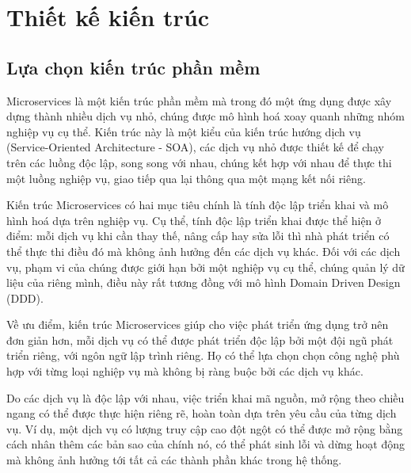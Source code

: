 \documentclass[../DoAn.tex]{subfiles}
\begin{document}
\section{Thiết kế kiến trúc}
\label{section:4.1}
\subsection{Lựa chọn kiến trúc phần mềm}
\label{subsection:4.1.1}
Microservices là một kiến trúc phần mềm mà trong đó một ứng dụng được xây dựng thành nhiều dịch vụ nhỏ, chúng được mô hình hoá xoay quanh những nhóm nghiệp vụ cụ thể.
Kiến trúc này là một kiểu của kiến trúc hướng dịch vụ (Service-Oriented Architecture - SOA), các dịch vụ nhỏ được thiết kế để chạy trên các luồng độc lập, song song
với nhau, chúng kết hợp với nhau để thực thi một luồng nghiệp vụ, giao tiếp qua lại thông qua một mạng kết nối riêng.\cite{MicroservicesPatterns}

Kiến trúc Microservices có hai mục tiêu chính là tính độc lập triển khai và mô hình hoá dựa trên nghiệp vụ. Cụ thể, tính độc lập triển khai được thể hiện ở điểm:
mỗi dịch vụ khi cần thay thế, nâng cấp hay sửa lỗi thì nhà phát triển có thể thực thi điều đó mà không ảnh hưởng đến các dịch vụ khác. Đối với các dịch vụ,
phạm vi của chúng được giới hạn bởi một nghiệp vụ cụ thể, chúng quản lý dữ liệu của riêng mình, điều này rất tương đồng với mô hình Domain Driven Design (DDD).\cite{BuildingMicroservices}

Về ưu điểm, kiến trúc Microservices giúp cho việc phát triển ứng dụng trở nên đơn giản hơn, mỗi dịch vụ có thể được phát triển độc lập bởi một đội ngũ phát triển riêng,
với ngôn ngữ lập trình riêng. Họ có thể lựa chọn chọn công nghệ phù hợp với từng loại nghiệp vụ mà không bị ràng buộc bởi các dịch vụ khác.\cite{BuildingMicroservices}

Do các dịch vụ là độc lập với nhau, việc triển khai mã nguồn, mở rộng theo chiều ngang có thể được thực hiện riêng rẽ, hoàn toàn dựa trên yêu cầu của từng dịch vụ.
Ví dụ, một dịch vụ có lượng truy cập cao đột ngột có thể được mở rộng bằng cách nhân thêm các bản sao của chính nó, có thể phát sinh lỗi và dừng hoạt động mà không ảnh hưởng
tới tất cả các thành phần khác trong hệ thống.\cite{BuildingMicroservices}
\end{document}
